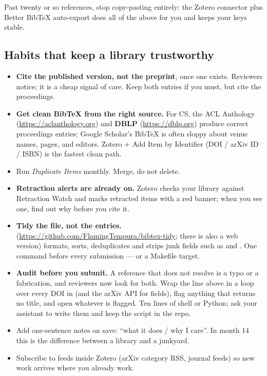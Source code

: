 \documentclass[11pt,a4paper]{article}
\begin{document}
Past twenty or so references, stop copy-pasting entirely: the Zotero connector
plus Better BibTeX auto-export does all of the above for you and keeps your
keys stable.

\subsection{Habits that keep a library trustworthy}

\begin{itemize}
  \item \textbf{Cite the published version, not the preprint}, once one
        exists. Reviewers notice; it is a cheap signal of care. Keep both
        entries if you must, but cite the proceedings.
  \item \textbf{Get clean BibTeX from the right source.} For CS, the ACL
        Anthology (\url{https://aclanthology.org}) and
        \textbf{DBLP} (\url{https://dblp.org}) produce correct proceedings
        entries; Google Scholar's BibTeX is often sloppy about venue names,
        pages, and editors. Zotero + Add Item by Identifier (DOI / arXiv ID /
        ISBN) is the fastest clean path.
  \item Run \emph{Duplicate Items} monthly. Merge, do not delete.
  \item \textbf{Retraction alerts are already on.} Zotero checks your library
        against Retraction Watch and marks retracted items with a red banner;
        when you see one, find out why before you cite it.
  \item \textbf{Tidy the file, not the entries.} 
        (\url{https://github.com/FlamingTempura/bibtex-tidy}; there is also a
        web version) formats, sorts, deduplicates and strips junk fields such
        as  and . One command before every
        submission --- or a Makefile target.
  \item \textbf{Audit before you submit.} A reference that does not resolve
        is a typo or a fabrication, and reviewers now look for both. Wrap the
         line above in a loop over every DOI in 
        (and the arXiv API for  fields), flag anything that
        returns no title, and open whatever is flagged. Ten lines of shell or
        Python; ask your assistant to write them and keep the script in the
        repo.
  \item Add one-sentence notes on save: ``what it does / why I care''. In
        month 14 this is the difference between a library and a junkyard.
  \item Subscribe to feeds inside Zotero (arXiv category RSS, journal feeds) so
        new work arrives where you already work.
\end{itemize}
\end{document}
